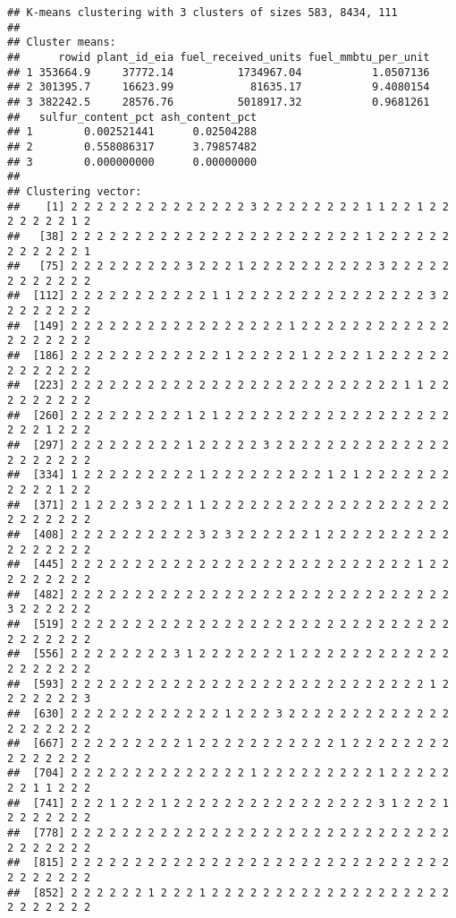 \documentclass[
]{article}
\begin{document}
\begin{verbatim}
## K-means clustering with 3 clusters of sizes 583, 8434, 111
## 
## Cluster means:
##      rowid plant_id_eia fuel_received_units fuel_mmbtu_per_unit
## 1 353664.9     37772.14          1734967.04           1.0507136
## 2 301395.7     16623.99            81635.17           9.4080154
## 3 382242.5     28576.76          5018917.32           0.9681261
##   sulfur_content_pct ash_content_pct
## 1        0.002521441      0.02504288
## 2        0.558086317      3.79857482
## 3        0.000000000      0.00000000
## 
## Clustering vector:
##    [1] 2 2 2 2 2 2 2 2 2 2 2 2 2 2 3 2 2 2 2 2 2 2 2 1 1 2 2 1 2 2 2 2 2 2 2 1 2
##   [38] 2 2 2 2 2 2 2 2 2 2 2 2 2 2 2 2 2 2 2 2 2 2 2 1 2 2 2 2 2 2 2 2 2 2 2 2 1
##   [75] 2 2 2 2 2 2 2 2 2 3 2 2 2 1 2 2 2 2 2 2 2 2 2 2 3 2 2 2 2 2 2 2 2 2 2 2 2
##  [112] 2 2 2 2 2 2 2 2 2 2 2 1 1 2 2 2 2 2 2 2 2 2 2 2 2 2 2 2 3 2 2 2 2 2 2 2 2
##  [149] 2 2 2 2 2 2 2 2 2 2 2 2 2 2 2 2 2 1 2 2 2 2 2 2 2 2 2 2 2 2 2 2 2 2 2 2 2
##  [186] 2 2 2 2 2 2 2 2 2 2 2 2 1 2 2 2 2 2 1 2 2 2 2 1 2 2 2 2 2 2 2 2 2 2 2 2 2
##  [223] 2 2 2 2 2 2 2 2 2 2 2 2 2 2 2 2 2 2 2 2 2 2 2 2 2 2 1 1 2 2 2 2 2 2 2 2 2
##  [260] 2 2 2 2 2 2 2 2 2 1 2 1 2 2 2 2 2 2 2 2 2 2 2 2 2 2 2 2 2 2 2 2 2 1 2 2 2
##  [297] 2 2 2 2 2 2 2 2 2 1 2 2 2 2 2 3 2 2 2 2 2 2 2 2 2 2 2 2 2 2 2 2 2 2 2 2 2
##  [334] 1 2 2 2 2 2 2 2 2 2 1 2 2 2 2 2 2 2 2 2 1 2 1 2 2 2 2 2 2 2 2 2 2 2 1 2 2
##  [371] 2 1 2 2 2 3 2 2 2 1 1 2 2 2 2 2 2 2 2 2 2 2 2 2 2 2 2 2 2 2 2 2 2 2 2 2 2
##  [408] 2 2 2 2 2 2 2 2 2 2 3 2 3 2 2 2 2 2 2 1 2 2 2 2 2 2 2 2 2 2 2 2 2 2 2 2 2
##  [445] 2 2 2 2 2 2 2 2 2 2 2 2 2 2 2 2 2 2 2 2 2 2 2 2 2 2 2 1 2 2 2 2 2 2 2 2 2
##  [482] 2 2 2 2 2 2 2 2 2 2 2 2 2 2 2 2 2 2 2 2 2 2 2 2 2 2 2 2 2 2 3 2 2 2 2 2 2
##  [519] 2 2 2 2 2 2 2 2 2 2 2 2 2 2 2 2 2 2 2 2 2 2 2 2 2 2 2 2 2 2 2 2 2 2 2 2 2
##  [556] 2 2 2 2 2 2 2 2 3 1 2 2 2 2 2 2 2 1 2 2 2 2 2 2 2 2 2 2 2 2 2 2 2 2 2 2 2
##  [593] 2 2 2 2 2 2 2 2 2 2 2 2 2 2 2 2 2 2 2 2 2 2 2 2 2 2 2 2 1 2 2 2 2 2 2 2 3
##  [630] 2 2 2 2 2 2 2 2 2 2 2 2 1 2 2 2 3 2 2 2 2 2 2 2 2 2 2 2 2 2 2 2 2 2 2 2 2
##  [667] 2 2 2 2 2 2 2 2 2 1 2 2 2 2 2 2 2 2 2 2 2 1 2 2 2 2 2 2 2 2 2 2 2 2 2 2 2
##  [704] 2 2 2 2 2 2 2 2 2 2 2 2 2 2 1 2 2 2 2 2 2 2 2 2 1 2 2 2 2 2 2 2 1 1 2 2 2
##  [741] 2 2 2 1 2 2 2 1 2 2 2 2 2 2 2 2 2 2 2 2 2 2 2 2 3 1 2 2 2 1 2 2 2 2 2 2 2
##  [778] 2 2 2 2 2 2 2 2 2 2 2 2 2 2 2 2 2 2 2 2 2 2 2 2 2 2 2 2 2 2 2 2 2 2 2 2 2
##  [815] 2 2 2 2 2 2 2 2 2 2 2 2 2 2 2 2 2 2 2 2 2 2 2 2 2 2 2 2 2 2 2 2 2 2 2 2 2
##  [852] 2 2 2 2 2 2 1 2 2 2 1 2 2 2 2 2 2 2 2 2 2 2 2 2 2 2 2 2 2 2 2 2 2 2 2 2 2

\end{verbatim}
\end{document}
